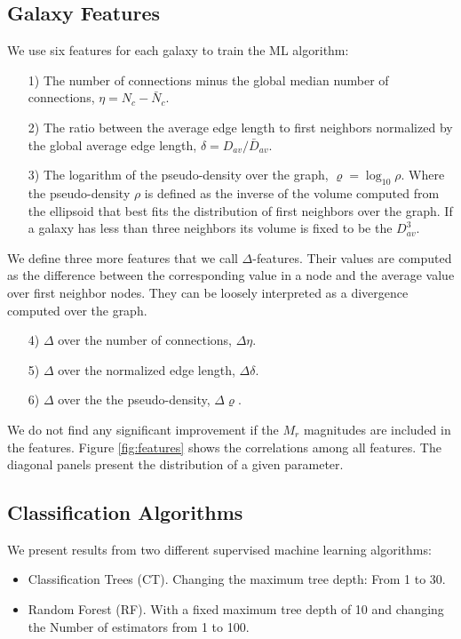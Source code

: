 \documentclass[usenatbib]{mnras}
\begin{document}
\subsection{Galaxy Features}

We use six features for each galaxy to train the ML algorithm:
\begin{enumerate}
\item[1)]
The number of connections minus the global median number of
connections, $\eta = N_c - \bar{N}_c$. 
\item[2)]
The ratio between the average edge length to first neighbors 
normalized by the global average edge length, $\delta=D_{av}/\bar{D}_{av}$. 
\item[3)] 
The logarithm of the pseudo-density over the graph,
  $\varrho=\log_{10}\rho$.   
Where the pseudo-density $\rho$ is defined as the inverse of the volume
computed from the ellipsoid that best fits the distribution of first
neighbors over the graph. 
If a galaxy has less than three neighbors its volume is fixed to be the $D_{av}^3$.
\end{enumerate}
\noindent
We define three more features that we call $\Delta$-features.
Their values are computed as the difference between the corresponding
value in a node and the average value over first neighbor nodes.  
They can be loosely interpreted as a divergence computed over the graph.

\begin{enumerate}
\item[4)] $\Delta$ over the number of connections, $\Delta\eta$.
\item[5)] $\Delta$ over the normalized edge length, $\Delta\delta$.
\item[6)] $\Delta$ over the the pseudo-density, $\Delta\varrho$.
\end{enumerate}

We do not find any significant improvement if the $M_{r}$ magnitudes are included in the features. 
Figure \ref{fig:features} shows the correlations among all features.
The diagonal panels present the distribution of a given parameter.


\subsection{Classification Algorithms}

We present results from two different supervised machine learning algorithms:

\begin{itemize}
    \item Classification Trees (CT). Changing the maximum tree depth: From 1 to 30.
    \item Random Forest (RF). With a fixed maximum tree depth of 10 and changing the Number of estimators from 1 to 100.
\end{itemize}
\end{document}
